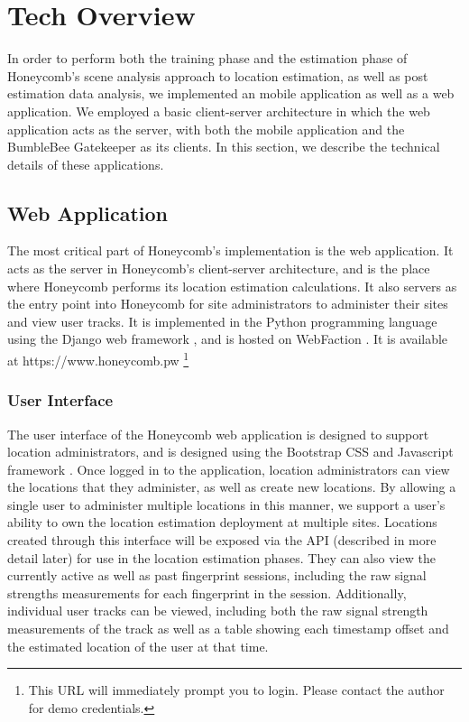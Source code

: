 \chapter{Tech Overview}
\label{tech-overview}
%

In order to perform both the training phase and the estimation phase of Honeycomb's scene analysis approach to location estimation, as well as post estimation data analysis, we implemented an mobile application as well as a web application. We employed a basic client-server architecture in which the web application acts as the server, with both the mobile application and the BumbleBee Gatekeeper as its clients. In this section, we describe the technical details of these applications.


\section{Web Application}
%


The most critical part of Honeycomb's implementation is the web application. It acts as the server in Honeycomb's client-server architecture, and is the place where Honeycomb performs its location estimation calculations. It also servers as the entry point into Honeycomb for site administrators to administer their sites and view user tracks. It is implemented in the Python programming language using the Django web framework \cite{django}, and is hosted on WebFaction \cite{webfaction}. It is available at https://www.honeycomb.pw \footnote{This URL will immediately prompt you to login. Please contact the author for demo credentials.}


\subsection{User Interface}
%


The user interface of the Honeycomb web application is designed to support location administrators, and is designed using the Bootstrap CSS and Javascript framework \cite{bootstrap}. Once logged in to the application, location administrators can view the locations that they administer, as well as create new locations. By allowing a single user to administer multiple locations in this manner, we support a user's ability to own the location estimation deployment at multiple sites. Locations created through this interface will be exposed via the API (described in more detail later) for use in the location estimation phases. They can also view the currently active as well as past fingerprint sessions, including the raw signal strengths measurements for each fingerprint in the session. Additionally, individual user tracks can be viewed, including both the raw signal strength measurements of the track as well as a table showing each timestamp offset and the estimated location of the user at that time. 
	

